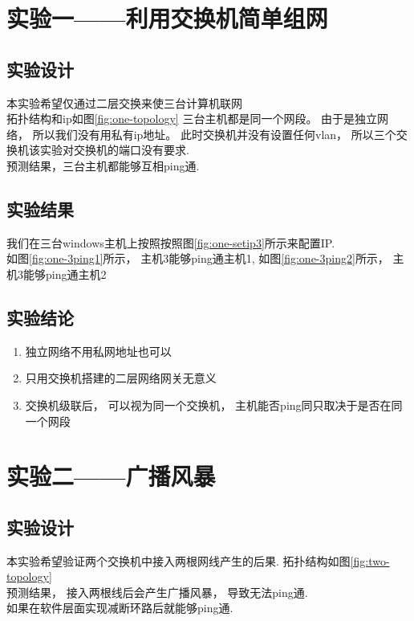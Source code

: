 
\section{实验一——利用交换机简单组网}
	\subsection{实验设计}
		本实验希望仅通过二层交换来使三台计算机联网\\
		拓扑结构和ip如图\ref{fig:one-topology}
		三台主机都是同一个网段。 由于是独立网络， 所以我们没有用私有ip地址。
		此时交换机并没有设置任何vlan， 所以三个交换机该实验对交换机的端口没有要求.\\
		预测结果，三台主机都能够互相ping通.
	\subsection{实验结果}
		我们在三台windows主机上按照按照图\ref{fig:one-setip3}所示来配置IP.\\
		如图\ref{fig:one-3ping1}所示， 主机3能够ping通主机1, 如图\ref{fig:one-3ping2}所示， 主机3能够ping通主机2\\
	\subsection{实验结论}
		\begin{enumerate}
		  \item 独立网络不用私网地址也可以
		  \item 只用交换机搭建的二层网络网关无意义
          \item 交换机级联后， 可以视为同一个交换机， 主机能否ping同只取决于是否在同一个网段

		\end{enumerate}
\section{实验二——广播风暴}
	\subsection{实验设计}
		本实验希望验证两个交换机中接入两根网线产生的后果.
		拓扑结构如图\ref{fig:two-topology}\\
		预测结果， 接入两根线后会产生广播风暴， 导致无法ping通.\\
		如果在软件层面实现减断环路后就能够ping通.
		
